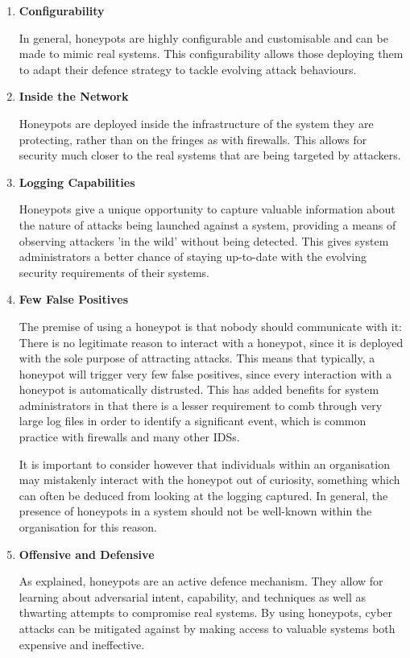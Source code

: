 \begin{enumerate}
\item \textbf{Configurability}

In general, honeypots are highly configurable and customisable and can be made to mimic real systems. This configurability allows those deploying them to adapt their defence strategy to tackle evolving attack behaviours.

\item \textbf{Inside the Network} 

Honeypots are deployed inside the infrastructure of the system they are protecting, rather than on the fringes as with firewalls. This allows for security much closer to the real systems that are being targeted by attackers.

\item  \textbf{Logging Capabilities} 

Honeypots give a unique opportunity to capture valuable information about the nature of attacks being launched against a system, providing a means of observing attackers 'in the wild' without being detected. This gives system administrators a better chance of staying up-to-date with the evolving security requirements of their systems.

\item  \textbf{Few False Positives}

The premise of using a honeypot is that nobody should communicate with it: There is no legitimate reason to interact with a honeypot, since it is deployed with the sole purpose of attracting attacks. This means that typically, a honeypot will trigger very few false positives, since every interaction with a honeypot is automatically distrusted. This has added benefits for system administrators in that there is a lesser requirement to comb through very large log files in order to identify a significant event, which is common practice with firewalls and many other IDSs.

It is important to consider however that individuals within an organisation may mistakenly interact with the honeypot out of curiosity, something which can often be deduced from looking at the logging captured. In general, the presence of honeypots in a system should not be well-known within the organisation for this reason.

\item  \textbf{Offensive and Defensive}

As explained, honeypots are an active defence mechanism. They allow for learning about adversarial intent, capability, and techniques as well as thwarting attempts to compromise real systems. By using honeypots, cyber attacks can be mitigated against by making access to valuable systems both expensive and ineffective.
\end{enumerate}


